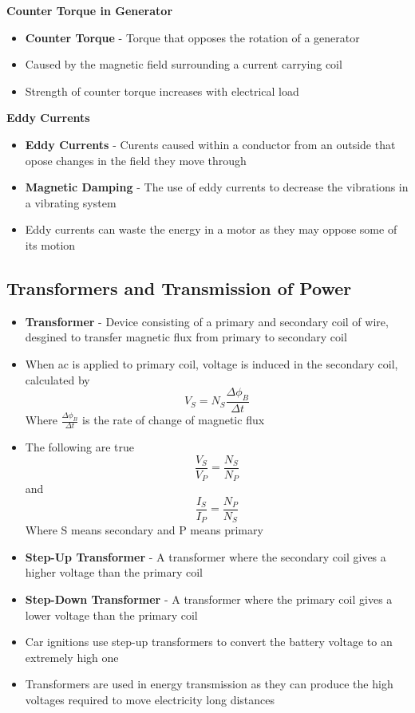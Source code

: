 \textbf{Counter Torque in Generator}
\begin{itemize}
    \item \textbf{Counter Torque} - Torque that opposes the rotation of a generator
    \item Caused by the magnetic field surrounding a current carrying coil
    \item Strength of counter torque increases with electrical load
\end{itemize}

\textbf{Eddy Currents}
\begin{itemize}
    \item \textbf{Eddy Currents} - Curents caused within a conductor from an outside that opose changes in the field they move through
    \item \textbf{Magnetic Damping} - The use of eddy currents to decrease the vibrations in a vibrating system
    \item Eddy currents can waste the energy in a motor as they may oppose some of its motion
\end{itemize}

\subsection{Transformers and Transmission of Power}
\begin{itemize}
    \item \textbf{Transformer} - Device consisting of a primary and secondary coil of wire, desgined to transfer magnetic flux from primary to secondary coil 
    \item When ac is applied to primary coil, voltage is induced in the secondary coil, calculated by \[V_S=N_S\frac{\Delta \phi_B}{\Delta t}\] Where \(\frac{\Delta \phi_B}{\Delta t}\) is the rate of change of magnetic flux
    \item The following are true \[\frac{V_S}{V_P}=\frac{N_S}{N_P}\] and \[\frac{I_S}{I_P}=\frac{N_P}{N_S}\]Where S means secondary and P means primary
    \item\textbf{Step-Up Transformer} - A transformer where the secondary coil gives a higher voltage than the primary coil 
    \item \textbf{Step-Down Transformer} - A transformer where the primary coil gives a lower voltage than the primary coil
    \item Car ignitions use step-up transformers to convert the battery voltage to an extremely high one
    \item Transformers are used in energy transmission as they can produce the high voltages required to move electricity long distances
\end{itemize}

